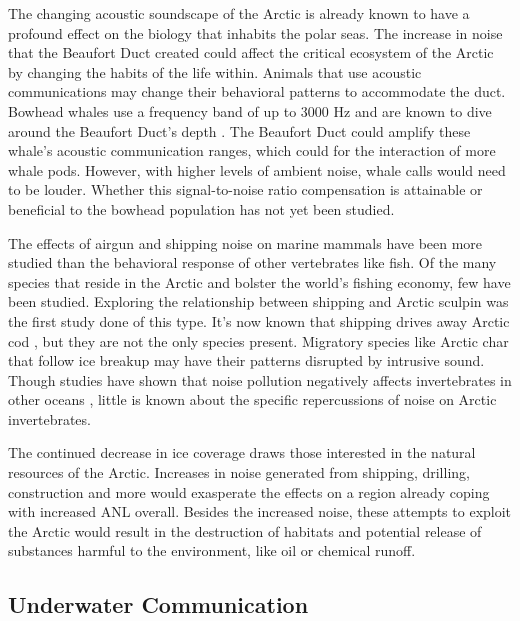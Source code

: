 The changing acoustic soundscape of the Arctic is already known to have a profound effect on the biology that inhabits the polar seas. The increase in noise that the Beaufort Duct created could affect the critical ecosystem of the Arctic by changing the habits of the life within. Animals that use acoustic communications may change their behavioral patterns to accommodate the duct. Bowhead whales use a frequency band of up to 3000 Hz \parencite{clark1984sounds} and are known to dive around the Beaufort Duct's depth \parencite{simon2009behaviour}. The Beaufort Duct could amplify these whale's acoustic communication ranges, which could for the interaction of more whale pods. However, with higher levels of ambient noise, whale calls would need to be louder. Whether this signal-to-noise ratio compensation is attainable or beneficial to the bowhead population has not yet been studied.

The effects of airgun \parencite{halliday2020potential} and shipping noise \parencite{halliday2017potential} on marine mammals have been more studied than the behavioral response of other vertebrates like fish. Of the many species that reside in the Arctic and bolster the world's fishing economy, few have been studied. Exploring the relationship between shipping and Arctic sculpin was the first study done of this type. \parencite{ivanova2018sculpin} It's now known that shipping drives away Arctic cod \parencite{ivanova2020shipping}, but they are not the only species present. Migratory species like Arctic char that follow ice breakup \parencite{hammer2021char} may have their patterns disrupted by intrusive sound. Though studies have shown that noise pollution negatively affects invertebrates in other oceans \parencite{difranco2020}, little is known about the specific repercussions of noise on Arctic invertebrates.

The continued decrease in ice coverage draws those interested in the natural resources of the Arctic. Increases in noise generated from shipping, drilling, construction \parencite{gering2020aca} and more would exasperate the effects on a region already coping with increased ANL overall. Besides the increased noise, these attempts to exploit the Arctic would result in the destruction of habitats and potential release of substances harmful to the environment, like oil or chemical runoff.


\subsection{Underwater Communication}

